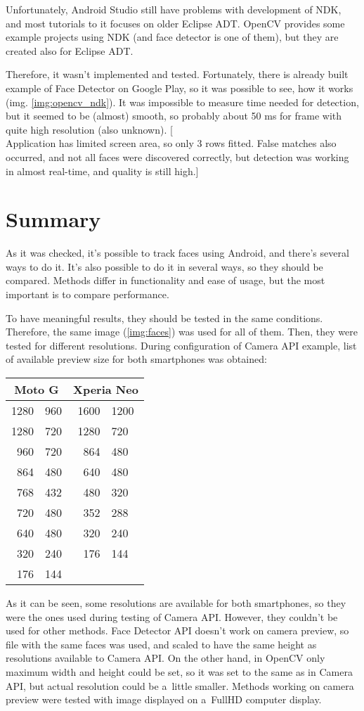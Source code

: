 Unfortunately, Android Studio still have problems with development of NDK, and
most tutorials to it focuses on older Eclipse ADT. 
OpenCV provides some example projects using NDK (and face detector is one of
them), but they are created also for Eclipse ADT.

Therefore, it wasn't implemented and tested. 
Fortunately, there is already built example of Face Detector on Google Play, so
it was possible to see, how it works (img. \ref{img:opencv_ndk}). 
It was impossible to measure time needed for
detection, but it seemed to be (almost) smooth, so probably about 50 ms for
frame with quite high resolution (also unknown).
[\\Application has limited screen area, so only 3 rows fitted. False matches
also occurred, and not all faces were discovered correctly, but detection was
working in almost real-time, and quality is still high.]

\section{Summary}
As it was checked, it's possible to track faces using Android, and there's
several ways to do it. 
It's also possible to do it in several ways, so they should be compared.
Methods differ in functionality and ease of usage, but the most important is to
compare performance.

To have meaningful results, they should be tested in the same conditions.
Therefore, the same image (\ref{img:faces}) was used for all of them.
Then, they were tested for different resolutions.
During configuration of Camera API example, list of available preview size for
both smartphones was obtained:
\begin{center}
\begin{tabular}{r@{ x }l|r@{ x }l}
\multicolumn{2}{c|}{Moto G} & \multicolumn{2}{c}{Xperia Neo} \\
\hline
1280 & 960 & 1600 & 1200 \\
1280 & 720 & 1280 & 720 \\
960 & 720 & 864 & 480 \\
864 & 480 & 640 & 480 \\
768 & 432 & 480 & 320 \\
720 & 480 & 352 & 288 \\
640 & 480 & 320 & 240 \\
320 & 240 & 176 & 144 \\
176 & 144 \\
\end{tabular}
\end{center}
As it can be seen, some resolutions are available for both smartphones, so they
were the ones used during testing of Camera API. 
However, they couldn't be used for other methods.
Face Detector API doesn't work on camera preview, so file with the same faces
was used, and scaled to have the same height as resolutions available to Camera API. 
On the other hand, in OpenCV only maximum width and height could be set, so it
was set to the same as in Camera API, but actual resolution could be a~little
smaller.
Methods working on camera preview were tested with image displayed on a~FullHD
computer display.

